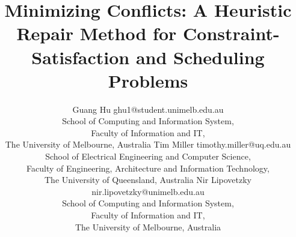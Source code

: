 \documentclass[twoside,11pt]{article}
\begin{document}
\title{Minimizing Conflicts: A Heuristic Repair Method for
       Constraint-Satisfaction and Scheduling Problems}

\author{\name Guang Hu \email ghu1@student.unimelb.edu.au \\
       \addr School of Computing and Information System,\\
        Faculty of Information and IT, \\
       The University of Melbourne, Australia
       \AND
       \name Tim Miller \email timothy.miller@uq.edu.au\\
       \addr School of Electrical Engineering and Computer Science, \\
            Faculty of Engineering, Architecture and Information Technology,\\
            The University of Queensland, Australia
       \AND
       \name Nir Lipovetzky \email nir.lipovetzky@unimelb.edu.au \\
       \addr School of Computing and Information System,\\
       Faculty of Information and IT, \\
       The University of Melbourne, Australia}


\maketitle


\begin{abstract}

\end{abstract}









\vskip 0.2in


\end{document}
